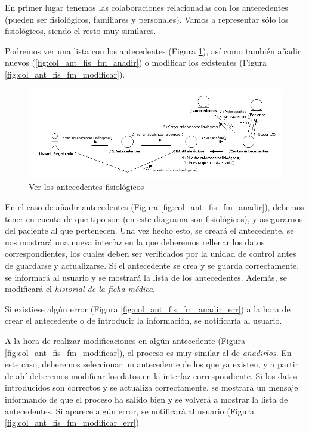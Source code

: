 		En primer lugar tenemos las colaboraciones relacionadas con los antecedentes (pueden ser fisiológicos, familiares y personales). Vamos a representar sólo los fisiológicos, siendo el resto muy similares.
		
		Podremos ver una lista con los antecedentes (Figura \ref{fig:col_ant_fis_fm}), así como también añadir nuevos (\ref{fig:col_ant_fis_fm_anadir}) o modificar los existentes (Figura \ref{fig:col_ant_fis_fm_modificar}).
		
		\bigskip
		\bigskip
		\begin{figure}[H]
		  \centering
		    \includegraphics[width=16cm]{img/jpg/colaboraciones/32_VerAntecedentesFisiologicos.jpg}
		  \caption{Ver los antecedentes fisiológicos}
		  \label{fig:col_ant_fis_fm}
		\end{figure}
		
		\bigskip
		En el caso de añadir antecedentes (Figura \ref{fig:col_ant_fis_fm_anadir}), debemos tener en cuenta de que tipo son (en este diagrama son fisiológicos), y asegurarnos del paciente al que pertenecen. Una vez hecho esto, se creará el antecedente, se nos mostrará una nueva interfaz en la que deberemos rellenar los datos correspondientes, los cuales deben ser verificados por la unidad de control antes de guardarse y actualizarse. Si el antecedente se crea y se guarda correctamente, se informará al usuario y se mostrará la lista de los antecedentes. Además, se modificará el \textit{historial de la ficha médica}.
		
		Si existiese algún error (Figura \ref{fig:col_ant_fis_fm_anadir_err}) a la hora de crear el antecedente o de introducir la información, se notificaría al usuario.
		
		A la hora de realizar modificaciones en algún antecedente (Figura \ref{fig:col_ant_fis_fm_modificar}), el proceso es muy similar al de \textit{añadirlos}. En este caso, deberemos seleccionar un antecedente de los que ya existen, y a partir de ahí deberemos modificar los datos en la interfaz correspondiente. Si los datos introducidos son correctos y se actualiza correctamente, se mostrará un mensaje informando de que el proceso ha salido bien y se volverá a mostrar la lista de antecedentes. Si aparece algún error, se notificará al usuario (Figura \ref{fig:col_ant_fis_fm_modificar_err})
		

